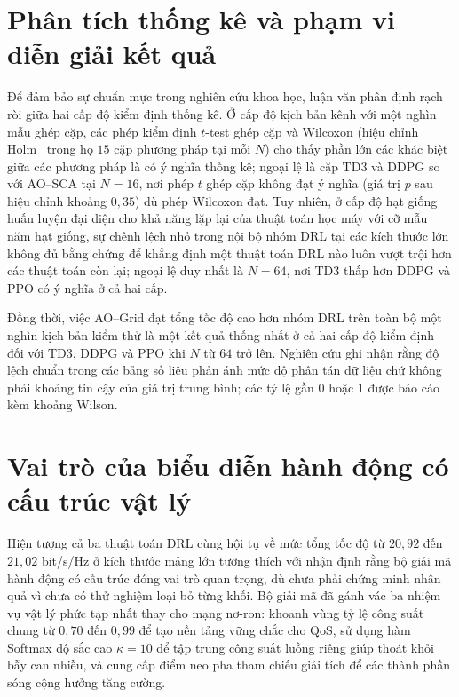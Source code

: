 

\section{Phân tích thống kê và phạm vi diễn giải kết quả}
\label{sec:phan-tich-thong-ke}

Để đảm bảo sự chuẩn mực trong nghiên cứu khoa học, luận văn phân định rạch ròi giữa hai cấp độ kiểm định thống kê.
Ở cấp độ kịch bản kênh với một nghìn mẫu ghép cặp, các phép kiểm định $t$-test ghép cặp và Wilcoxon (hiệu chỉnh
Holm~\cite{Holm1979} trong họ $15$ cặp phương pháp tại mỗi $N$) cho thấy phần lớn các khác biệt giữa các phương pháp
là có ý nghĩa thống kê; ngoại lệ là cặp TD3 và DDPG so với AO--SCA tại $N = 16$, nơi phép $t$ ghép cặp không đạt ý
nghĩa (giá trị $p$ sau hiệu chỉnh khoảng $0,35$) dù phép Wilcoxon đạt. Tuy nhiên, ở cấp độ hạt giống huấn luyện đại
diện cho khả năng lặp lại của thuật toán học máy với cỡ mẫu năm hạt giống, sự chênh lệch nhỏ trong nội bộ nhóm DRL
tại các kích thước lớn không đủ bằng chứng để khẳng định một thuật toán DRL nào luôn vượt trội hơn các thuật toán còn
lại; ngoại lệ duy nhất là $N = 64$, nơi TD3 thấp hơn DDPG và PPO có ý nghĩa ở cả hai cấp.

Đồng thời, việc AO--Grid đạt tổng tốc độ cao hơn nhóm DRL trên toàn bộ một nghìn kịch bản kiểm thử là một kết quả
thống nhất ở cả hai cấp độ kiểm định đối với TD3, DDPG và PPO khi $N$ từ $64$ trở lên. Nghiên cứu ghi nhận rằng độ
lệch chuẩn trong các bảng số liệu phản ánh mức độ phân tán dữ liệu chứ không phải khoảng tin cậy của giá trị trung
bình; các tỷ lệ gần $0$ hoặc $1$ được báo cáo kèm khoảng Wilson.

\section{Vai trò của biểu diễn hành động có cấu trúc vật lý}
\label{sec:vai-tro-bieu-dien}

Hiện tượng cả ba thuật toán DRL cùng hội tụ về mức tổng tốc độ từ $20,92$ đến $21,02$ bit/s/Hz ở kích thước mảng
lớn tương thích với nhận định rằng bộ giải mã hành động có cấu trúc đóng vai trò quan trọng, dù chưa phải chứng minh
nhân quả vì chưa có thử nghiệm loại bỏ từng khối. Bộ giải mã đã gánh vác ba nhiệm vụ vật lý phức tạp nhất thay cho
mạng nơ-ron: khoanh vùng tỷ lệ công suất chung từ $0,70$ đến $0,99$ để tạo nền tảng vững chắc cho QoS, sử dụng hàm
Softmax độ sắc cao $\kappa = 10$ để tập trung công suất luồng riêng giúp thoát khỏi bẫy can nhiễu, và cung cấp điểm
neo pha tham chiếu giải tích để các thành phần sóng cộng hưởng tăng cường.

